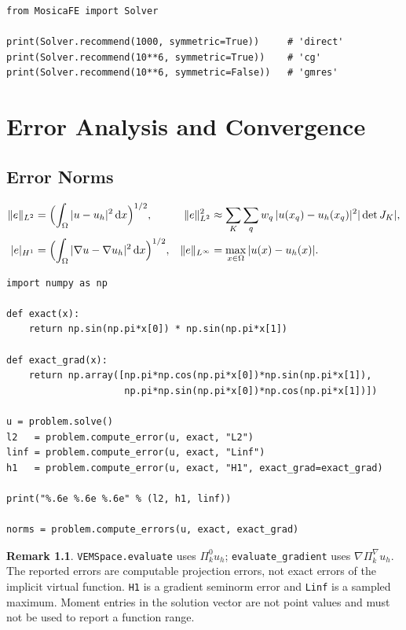 \documentclass[11pt,oneside]{book}
\theoremstyle{definition}
\newtheorem{remark}{Remark}[chapter]
\theoremstyle{plain}
\newcommand{\code}[1]{\texttt{#1}}
\newcommand{\dif}{\,\mathrm{d}}
\begin{document}
\begin{lstlisting}[language=MosicaFE,caption={Automatic selection}]
from MosicaFE import Solver

print(Solver.recommend(1000, symmetric=True))     # 'direct'
print(Solver.recommend(10**6, symmetric=True))    # 'cg'
print(Solver.recommend(10**6, symmetric=False))   # 'gmres'
\end{lstlisting}

\chapter{Error Analysis and Convergence}
\label{chap:error}

\section{Error Norms}

\begin{align}
\|e\|_{L^2}&=\Bigl(\int_\Omega|u-u_h|^2\dif x\Bigr)^{1/2},&
\|e\|_{L^2}^2&\approx\sum_K\sum_q w_q\,|u(x_q)-u_h(x_q)|^2|\det J_K|,
\label{eq:l2norm}\\
|e|_{H^1}&=\Bigl(\int_\Omega|\nabla u-\nabla u_h|^2\dif x\Bigr)^{1/2},&
\|e\|_{L^\infty}&=\max_{x\in\Omega}|u(x)-u_h(x)| .
\label{eq:h1norm}
\end{align}

\begin{lstlisting}[language=MosicaFE,caption={Computing the three norms}]
import numpy as np

def exact(x):
    return np.sin(np.pi*x[0]) * np.sin(np.pi*x[1])

def exact_grad(x):
    return np.array([np.pi*np.cos(np.pi*x[0])*np.sin(np.pi*x[1]),
                     np.pi*np.sin(np.pi*x[0])*np.cos(np.pi*x[1])])

u = problem.solve()
l2   = problem.compute_error(u, exact, "L2")
linf = problem.compute_error(u, exact, "Linf")
h1   = problem.compute_error(u, exact, "H1", exact_grad=exact_grad)

print("%.6e %.6e %.6e" % (l2, h1, linf))

norms = problem.compute_errors(u, exact, exact_grad)
\end{lstlisting}

\begin{remark}
\code{VEMSpace.evaluate} uses $\Pi_k^0u_h$; \code{evaluate\_\allowbreak gradient} uses
$\nabla\Pi_k^\nabla u_h$. The reported errors are computable projection errors,
not exact errors of the implicit virtual function. \code{H1} is a gradient seminorm
error and \code{Linf} is a sampled maximum. Moment entries in the solution vector
are not point values and must not be used to report a function range.

\end{remark}
\end{document}
